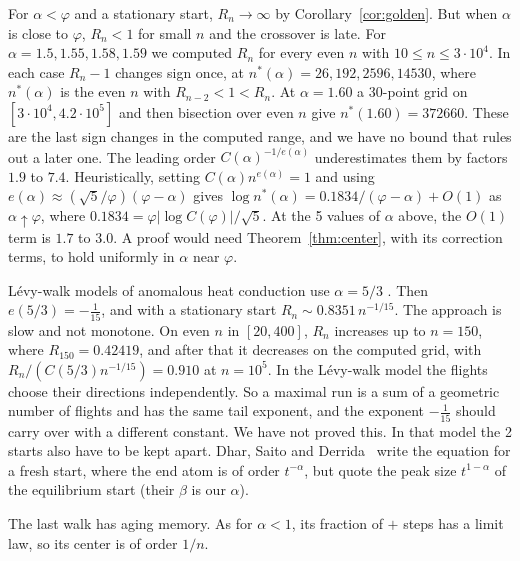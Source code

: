 \begin{remark}\label{rem:crossover}
For $\alpha<\varphi$ and a stationary start, $R_n\to\infty$ by
Corollary~\ref{cor:golden}. But when
$\alpha$ is close to $\varphi$, $R_n<1$ for small $n$ and the crossover is
late. For $\alpha=1.5,1.55,1.58,1.59$ we computed $R_n$ for every even $n$
with $10\le n\le3\cdot10^4$. In each case $R_n-1$ changes sign once, at
$n^*(\alpha)=26,192,2596,14530$, where $n^*(\alpha)$ is the even $n$ with
$R_{n-2}<1<R_n$. At $\alpha=1.60$ a 30-point grid on
$[3\cdot10^4,4.2\cdot10^5]$ and then bisection over even $n$ give
$n^*(1.60)=372660$. These are the last sign changes in the computed range,
and we have no bound that rules out a later one. The leading order
$C(\alpha)^{-1/e(\alpha)}$ underestimates them by factors $1.9$ to $7.4$.
Heuristically, setting $C(\alpha)n^{e(\alpha)}=1$ and using
$e(\alpha)\approx(\sqrt5/\varphi)(\varphi-\alpha)$ gives
$\log n^*(\alpha)=0.1834/(\varphi-\alpha)+O(1)$ as $\alpha\uparrow\varphi$,
where $0.1834=\varphi\lvert\log C(\varphi)\rvert/\sqrt5$. At the 5 values of
$\alpha$ above, the $O(1)$ term is $1.7$ to $3.0$. A proof would need
Theorem~\ref{thm:center}, with its correction terms, to hold uniformly in
$\alpha$ near $\varphi$.
\end{remark}

\begin{remark}\label{rem:heat}
L\'evy-walk models of anomalous heat conduction use $\alpha=5/3$
\cite{dsd2013,zdk2015}. Then $e(5/3)=-\frac1{15}$, and with a stationary
start $R_n\sim0.8351\,n^{-1/15}$. The approach is slow and not monotone. On
even $n$ in $[20,400]$, $R_n$ increases up to $n=150$, where
$R_{150}=0.42419$, and after that it decreases on the computed grid, with
$R_n/(C(5/3)n^{-1/15})=0.910$ at $n=10^5$. In the L\'evy-walk model the
flights choose their directions independently. So a maximal run is a sum of
a geometric number of flights and has the same tail exponent, and the exponent
$-\frac1{15}$ should carry over with a different constant. We have not proved
this. In that model the 2 starts also have to be kept apart. Dhar, Saito and
Derrida~\cite{dsd2013} write the equation for a fresh start, where the end
atom is of order $t^{-\alpha}$, but quote the peak size $t^{1-\alpha}$ of the
equilibrium start (their $\beta$ is our $\alpha$).
\end{remark}

The last walk has aging memory. As for $\alpha<1$, its fraction of $+$ steps
has a limit law, so its center is of order $1/n$.

